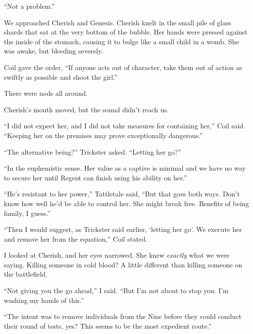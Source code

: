 ``Not a problem.''



We approached Cherish and Genesis. Cherish knelt in the small pile of glass shards that sat at the very bottom of the bubble.  Her hands were pressed against the inside of the stomach, causing it to bulge like a small child in a womb.  She was awake, but bleeding severely.



Coil gave the order, ``If anyone acts out of character, take them out of action as swiftly as possible and shoot the girl.''



There were nods all around.



Cherish's mouth moved, but the sound didn't reach us.



``I did not expect her, and I did not take measures for containing her,'' Coil said.  ``Keeping her on the premises may prove exceptionally dangerous.''



``The alternative being?'' Trickster asked.  ``Letting her go?''



``In the euphemistic sense.  Her value as a captive is minimal and we have no way to secure her until Regent can finish using his ability on her.''



``He's resistant to her power,'' Tattletale said, ``But that goes both ways.  Don't know how well he'd be able to control her.  She might break free.  Benefits of being family, I guess.''



``Then I would suggest, as Trickster said earlier, `letting her go'.  We execute her and remove her from the equation,''  Coil stated.



I looked at Cherish, and her eyes narrowed.  She knew \emph{exactly} what we were saying.  Killing someone in cold blood?  A little different than killing someone on the battlefield.



``Not giving you the go ahead,'' I said.  ``But I'm not about to stop you.  I'm washing my hands of this.''



``The intent was to remove individuals from the Nine before they could conduct their round of tests, yes?  This seems to be the most expedient route.''



